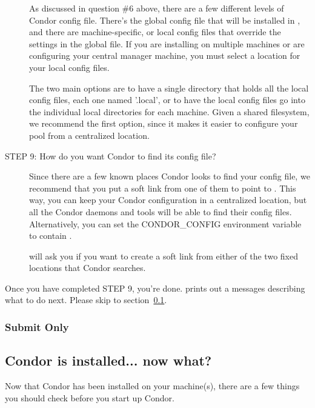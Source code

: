 \begin{description}
     As discussed in question \#6 above, there are a few different
     levels of Condor config file.  There's the global config file
     that will be installed in , and
     there are machine-specific, or local config files that override
     the settings in the global file.  If you are installing on
     multiple machines or are configuring your central manager
     machine, you must select a location for your local config files. 

     The two main options are to have a single directory that holds
     all the local config files, each one named '.local',
     or to have the local config files go into the individual local
     directories for each machine.  Given a shared filesystem, we
     recommend the first option, since it makes it easier to configure
     your pool from a centralized location.


\item[STEP 9: How do you want Condor to find its config file?]

     Since there are a few known places Condor looks to find your
     config file, we recommend that you put a soft link from one of
     them to point to .  This way, you
     can keep your Condor configuration in a centralized location, but
     all the Condor daemons and tools will be able to find their
     config files.  Alternatively, you can set the CONDOR\_CONFIG
     environment variable to contain .

      will ask you if you want to create a soft link
     from either of the two fixed locations that Condor searches.

\end{description}

Once you have completed STEP 9, you're done.   prints
out a messages describing what to do next.  Please skip to 
section~\ref{installed-now-what}.

\subsubsection{Submit Only}
\Todo

\subsection{Condor is installed... now what?}
\label{installed-now-what}

Now that Condor has been installed on your machine(s), there are a few
things you should check before you start up Condor.

